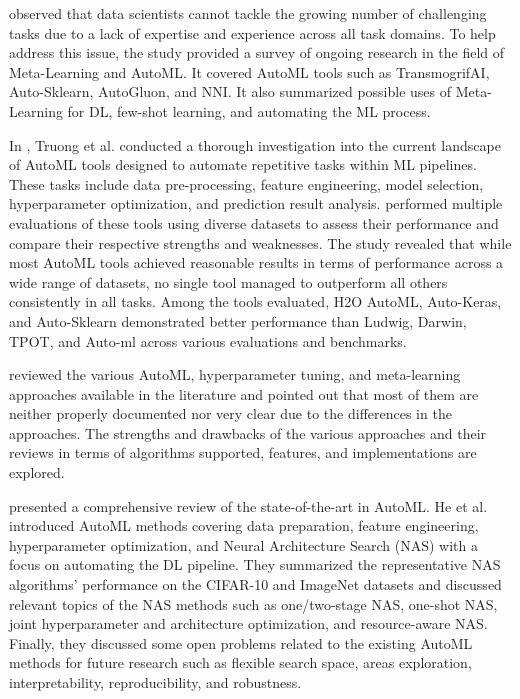 \cite{9579526} observed that data scientists cannot tackle the growing number of challenging tasks due to a lack of expertise and experience across all task domains.
To help address this issue, the study provided a survey of ongoing research in the field of Meta-Learning and AutoML.
It covered AutoML tools such as TransmogrifAI, Auto-Sklearn, AutoGluon, and NNI.
It also summarized possible uses of Meta-Learning for DL, few-shot learning, and automating the ML process.

In \cite{8995391}, Truong et al. conducted a thorough investigation into the current landscape of AutoML tools designed to automate repetitive tasks within ML pipelines.
These tasks include data pre-processing, feature engineering, model selection, hyperparameter optimization, and prediction result analysis.
performed multiple evaluations of these tools using diverse datasets to assess their performance and compare their respective strengths and weaknesses.
The study revealed that while most AutoML tools achieved reasonable results in terms of performance across a wide range of datasets, no single tool managed to outperform all others consistently in all tasks.
Among the tools evaluated, H2O AutoML, Auto-Keras, and Auto-Sklearn demonstrated better performance than Ludwig, Darwin, TPOT, and Auto-ml across various evaluations and benchmarks.

\cite{9033810} reviewed the various AutoML, hyperparameter tuning, and meta-learning approaches available in the literature and pointed out that most of them are neither properly documented nor very clear due to the differences in the approaches.
The strengths and drawbacks of the various approaches and their reviews in terms of algorithms supported, features, and implementations are explored.

\cite{HE2021106622} presented a comprehensive review of the state-of-the-art in AutoML.
He et al. introduced AutoML methods covering data preparation, feature engineering, hyperparameter optimization, and Neural Architecture Search (NAS) with a focus on automating the DL pipeline.
They summarized the representative NAS algorithms’ performance on the CIFAR-10 and ImageNet datasets and discussed relevant topics of the NAS methods such as one\slash two-stage NAS, one-shot NAS, joint hyperparameter and architecture optimization, and resource-aware NAS.
Finally, they discussed some open problems related to the existing AutoML methods for future research such as flexible search space, areas exploration, interpretability, reproducibility, and robustness.

